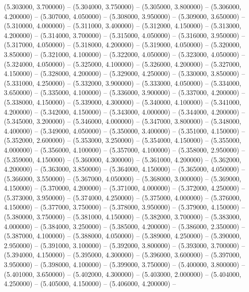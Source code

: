 (5.303000, 3.700000) -- 
(5.304000, 3.750000) -- 
(5.305000, 3.800000) -- 
(5.306000, 4.200000) -- 
(5.307000, 4.050000) -- 
(5.308000, 3.950000) -- 
(5.309000, 3.650000) -- 
(5.310000, 4.000000) -- 
(5.311000, 3.400000) -- 
(5.312000, 4.150000) -- 
(5.313000, 4.200000) -- 
(5.314000, 3.700000) -- 
(5.315000, 4.050000) -- 
(5.316000, 3.950000) -- 
(5.317000, 4.050000) -- 
(5.318000, 4.200000) -- 
(5.319000, 4.050000) -- 
(5.320000, 3.850000) -- 
(5.321000, 4.100000) -- 
(5.322000, 4.050000) -- 
(5.323000, 4.050000) -- 
(5.324000, 4.050000) -- 
(5.325000, 4.100000) -- 
(5.326000, 4.200000) -- 
(5.327000, 4.150000) -- 
(5.328000, 4.200000) -- 
(5.329000, 4.250000) -- 
(5.330000, 3.850000) -- 
(5.331000, 4.250000) -- 
(5.332000, 3.900000) -- 
(5.333000, 4.050000) -- 
(5.334000, 3.650000) -- 
(5.335000, 4.100000) -- 
(5.336000, 3.900000) -- 
(5.337000, 4.200000) -- 
(5.338000, 4.150000) -- 
(5.339000, 4.300000) -- 
(5.340000, 4.100000) -- 
(5.341000, 4.200000) -- 
(5.342000, 4.150000) -- 
(5.343000, 4.000000) -- 
(5.344000, 4.200000) -- 
(5.345000, 3.200000) -- 
(5.346000, 4.000000) -- 
(5.347000, 3.800000) -- 
(5.348000, 4.400000) -- 
(5.349000, 4.050000) -- 
(5.350000, 3.400000) -- 
(5.351000, 4.150000) -- 
(5.352000, 2.600000) -- 
(5.353000, 3.250000) -- 
(5.354000, 4.150000) -- 
(5.355000, 4.000000) -- 
(5.356000, 4.100000) -- 
(5.357000, 4.100000) -- 
(5.358000, 2.950000) -- 
(5.359000, 4.150000) -- 
(5.360000, 4.300000) -- 
(5.361000, 4.200000) -- 
(5.362000, 4.200000) -- 
(5.363000, 3.850000) -- 
(5.364000, 4.150000) -- 
(5.365000, 4.050000) -- 
(5.366000, 3.550000) -- 
(5.367000, 4.050000) -- 
(5.368000, 3.000000) -- 
(5.369000, 4.150000) -- 
(5.370000, 4.200000) -- 
(5.371000, 4.000000) -- 
(5.372000, 4.250000) -- 
(5.373000, 3.950000) -- 
(5.374000, 4.250000) -- 
(5.375000, 4.000000) -- 
(5.376000, 4.150000) -- 
(5.377000, 3.750000) -- 
(5.378000, 3.950000) -- 
(5.379000, 4.150000) -- 
(5.380000, 3.750000) -- 
(5.381000, 4.150000) -- 
(5.382000, 3.700000) -- 
(5.383000, 4.000000) -- 
(5.384000, 3.250000) -- 
(5.385000, 4.200000) -- 
(5.386000, 2.350000) -- 
(5.387000, 4.100000) -- 
(5.388000, 4.050000) -- 
(5.389000, 4.250000) -- 
(5.390000, 2.950000) -- 
(5.391000, 3.100000) -- 
(5.392000, 3.800000) -- 
(5.393000, 3.700000) -- 
(5.394000, 4.150000) -- 
(5.395000, 4.300000) -- 
(5.396000, 3.600000) -- 
(5.397000, 3.950000) -- 
(5.398000, 4.100000) -- 
(5.399000, 3.750000) -- 
(5.400000, 3.800000) -- 
(5.401000, 3.650000) -- 
(5.402000, 4.300000) -- 
(5.403000, 2.000000) -- 
(5.404000, 4.250000) -- 
(5.405000, 4.150000) -- 
(5.406000, 4.200000) -- 
